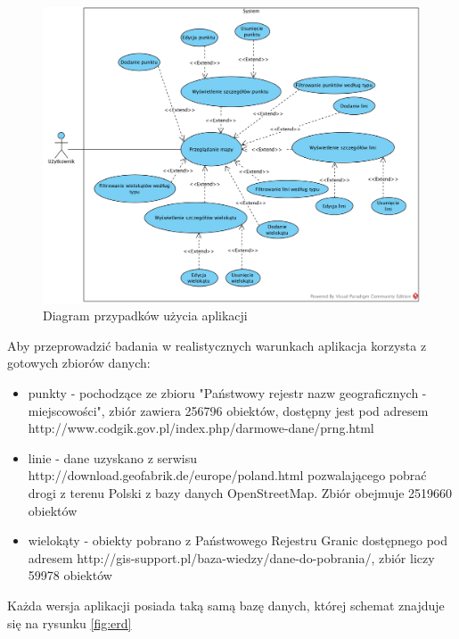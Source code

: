 \documentclass[printmode]{mgr}
\begin{document}
\begin{figure}[H]
  \centering
  \includegraphics[width=1\linewidth]{pictures/use_cases}
  \caption{Diagram przypadków użycia aplikacji}
  \label{fig:use_cases}
\end{figure}

Aby przeprowadzić badania w realistycznych warunkach aplikacja korzysta z gotowych zbiorów danych:
\begin{itemize}
  \item punkty - pochodzące ze zbioru "Państwowy rejestr nazw geograficznych - miejscowości", zbiór zawiera 256796 obiektów, dostępny jest pod adresem http://www.codgik.gov.pl/index.php/darmowe-dane/prng.html
  \item linie - dane uzyskano z serwisu http://download.geofabrik.de/europe/poland.html pozwalającego pobrać drogi z terenu Polski z bazy danych OpenStreetMap. Zbiór obejmuje 2519660 obiektów
  \item wielokąty - obiekty pobrano z Państwowego Rejestru Granic dostępnego pod adresem http://gis-support.pl/baza-wiedzy/dane-do-pobrania/, zbiór liczy 59978 obiektów
\end{itemize}

Każda wersja aplikacji posiada taką samą bazę danych, której schemat znajduje się na rysunku \ref{fig:erd}
\end{document}
